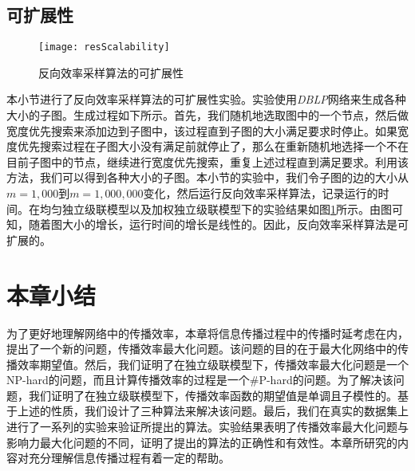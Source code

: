 \subsection{可扩展性}
\label{subsec4:scalability}
\begin{figure}[ht]
    \centering
    \texttt{[image: resScalability]}
    \caption{反向效率采样算法的可扩展性}
    \label{fig:scalability}
\end{figure}

本小节进行了反向效率采样算法的可扩展性实验。实验使用\textit{DBLP}网络来生成各种大小的子图。生成过程如下所示。首先，我们随机地选取图中的一个节点，然后做宽度优先搜索来添加边到子图中，该过程直到子图的大小满足要求时停止。如果宽度优先搜索过程在子图大小没有满足前就停止了，那么在重新随机地选择一个不在目前子图中的节点，继续进行宽度优先搜索，重复上述过程直到满足要求。利用该方法，我们可以得到各种大小的子图。本小节的实验中，我们令子图的边的大小从$m=1,000$到$m=1,000,000$变化，然后运行反向效率采样算法，记录运行的时间。在均匀独立级联模型以及加权独立级联模型下的实验结果如图\ref{fig:scalability}所示。由图可知，随着图大小的增长，运行时间的增长是线性的。因此，反向效率采样算法是可扩展的。
\section{本章小结}
\label{sec4:conclusion}
为了更好地理解网络中的传播效率，本章将信息传播过程中的传播时延考虑在内，提出了一个新的问题，传播效率最大化问题。该问题的目的在于最大化网络中的传播效率期望值。然后，我们证明了在独立级联模型下，传播效率最大化问题是一个NP-hard的问题，而且计算传播效率的过程是一个\#P-hard的问题。为了解决该问题，我们证明了在独立级联模型下，传播效率函数的期望值是单调且子模性的。基于上述的性质，我们设计了三种算法来解决该问题。最后，我们在真实的数据集上进行了一系列的实验来验证所提出的算法。实验结果表明了传播效率最大化问题与影响力最大化问题的不同，证明了提出的算法的正确性和有效性。本章所研究的内容对充分理解信息传播过程有着一定的帮助。


